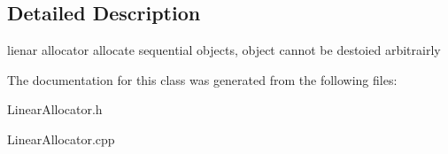 \subsection{Detailed Description}
lienar allocator allocate sequential objects, object cannot be destoied arbitrairly 

The documentation for this class was generated from the following files\-:\begin{DoxyCompactItemize}
\item 
Linear\-Allocator.\-h\item 
Linear\-Allocator.\-cpp\end{DoxyCompactItemize}
